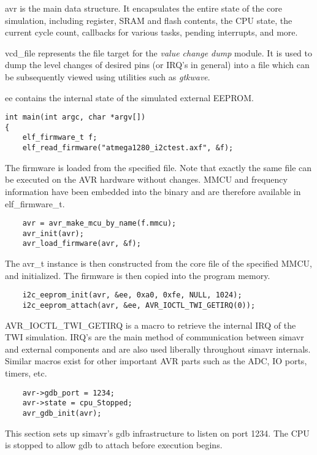 avr is the main data structure. It encapsulates the entire state of the
core simulation, including register, SRAM and flash contents, the CPU state, the
current cycle count, callbacks for various tasks, pending interrupts, and more.

vcd\_file represents the file target for the \emph{value change dump} module. It
is used to dump the level changes of desired pins (or IRQ's in general) into a
file which can be subsequently viewed using utilities such as \emph{gtkwave}.

ee contains the internal state of the simulated external EEPROM.

\begin{lstlisting}
int main(int argc, char *argv[])
{
    elf_firmware_t f;
    elf_read_firmware("atmega1280_i2ctest.axf", &f);
\end{lstlisting}

The firmware is loaded from the specified file. Note that exactly the same file
can be executed on the AVR hardware without changes. MMCU and frequency
information have been embedded into the binary and are therefore available in
elf\_firmware\_t.

\begin{lstlisting}
    avr = avr_make_mcu_by_name(f.mmcu);
    avr_init(avr);
    avr_load_firmware(avr, &f);
\end{lstlisting}

The avr\_t instance is then constructed from the core file of the specified
MMCU, and initialized. The firmware is then copied into the program memory.

\begin{lstlisting}
    i2c_eeprom_init(avr, &ee, 0xa0, 0xfe, NULL, 1024);
    i2c_eeprom_attach(avr, &ee, AVR_IOCTL_TWI_GETIRQ(0));
\end{lstlisting}

AVR\_IOCTL\_TWI\_GETIRQ is a macro to retrieve the internal IRQ of the TWI
simulation. IRQ's are the main method of communication between simavr and
external components and are also used liberally throughout simavr internals.
Similar macros exist for other important AVR parts such as the ADC, IO ports,
timers, etc.

\begin{lstlisting}
    avr->gdb_port = 1234;
    avr->state = cpu_Stopped;
    avr_gdb_init(avr);
\end{lstlisting}

This section sets up simavr's gdb infrastructure to listen on port 1234. The
CPU is stopped to allow gdb to attach before execution begins.


